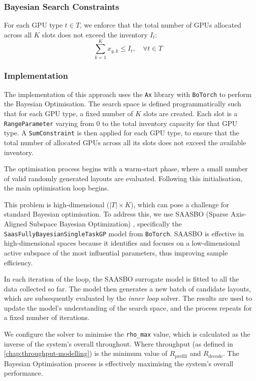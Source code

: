 \subsubsection*{Bayesian Search Constraints}

For each GPU type \( t \in T \), we enforce that the total number of GPUs allocated across all \( K \) slots does not exceed the inventory \( I_t \):
\[
\sum_{k=1}^{K} x_{g,k} \leq I_t, \quad \forall t \in T
\]

\subsubsection*{Implementation}

The implementation of this approach uses the \texttt{Ax} \autocite{FacebookAx2025} library with \texttt{BoTorch} \autocite{PytorchBotorch2025} to perform the Bayesian Optimisation.
The search space is defined programmatically such that for each GPU type, a fixed number of \(K\) slots are created.
Each slot is a \texttt{RangeParameter} varying from 0 to the total inventory capacity for that GPU type.
A \texttt{SumConstraint} is then applied for each GPU type, to ensure that the total number of allocated GPUs across all its slots does not exceed the available inventory.

The optimisation process begins with a warm-start phase, where a small number of valid randomly generated layouts are evaluated.
Following this initialisation, the main optimisation loop begins.

This problem is high-dimensional (\( |T| \times K \)), which can pose a challenge for standard Bayesian optimisation.
To address this, we use SAASBO (Sparse Axis-Aligned Subspace Bayesian Optimization) \autocite{erikssonHighDimensionalBayesianOptimization2021}, specifically the \texttt{SaasFullyBayesianSingleTaskGP} model from \texttt{BoTorch}.
SAASBO is effective in high-dimensional spaces because it identifies and focuses on a low-dimensional active subspace of the most influential parameters, thus improving sample efficiency.

In each iteration of the loop, the SAASBO surrogate model is fitted to all the data collected so far.
The model then generates a new batch of candidate layouts, which are subsequently evaluated by the \textit{inner loop} solver.
The results are used to update the model's understanding of the search space, and the process repeats for a fixed number of iterations.

We configure the solver to minimise the \texttt{rho\_max} value, which is calculated as the inverse of the system's overall throughout.
Where throughput (as defined in \autoref{chap:throughput-modelling}) is the minimum value of \(R_{\text{prefill}}\) and \(R_{\text{decode}}\).
The Bayesian Optimisation process is effectively maximising the system's overall performance.

